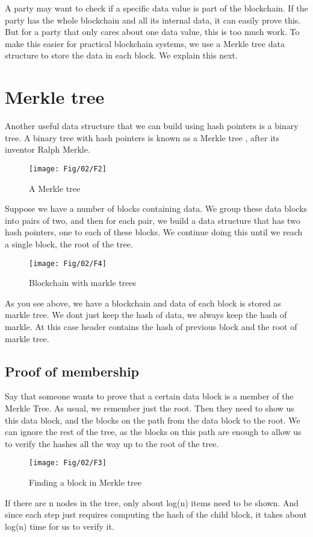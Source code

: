 A party may want to check if a specific data value is part of the blockchain. If the party has the whole blockchain and all its internal data, it can easily prove this. But for a party that only cares about one data value, this is too much work. To make this easier for practical blockchain systems, we use a Merkle tree data structure to store the data in each block. We explain this next.
\section{Merkle tree}
Another useful data structure that we can build using hash pointers is a binary tree. A binary tree with hash pointers is known as a Merkle tree , after its inventor Ralph Merkle.
\begin{figure}[h!]
	\centering
	\texttt{[image: Fig/02/F2]}
	\caption{A Merkle tree}
	\label{fig:l2_f2}
\end{figure}
Suppose we have a number of blocks containing data. We group these data blocks into pairs of two, and then for each pair, we build a data structure that has two hash pointers, one to each of these blocks. We continue doing this until we reach a single block, the root of the tree.

\begin{figure}[h!]
	\centering
	\texttt{[image: Fig/02/F4]}
	\caption{Blockchain with markle trees}
	\label{fig:l2_f4}
\end{figure}

As you see above, we have a blockchain and data of each block is stored as markle tree. We dont just keep the hash of data, we always keep the hash of markle. At this case header contains the hash of previous block and the root of markle tree.

\subsection*{Proof of membership}
Say that someone wants to prove that a certain data block is a member of the Merkle Tree. As usual, we remember just the root. Then they need to show us this data block, and the blocks on the path from the data block to the root. We can ignore the rest of the tree, as the blocks on this path are enough to allow us to verify the hashes all the way up to the root of the tree.
\begin{center}
	\begin{figure}[h!]
		\centering
		\texttt{[image: Fig/02/F3]}
		\caption{Finding a block in Merkle tree}
		\label{fig:l2_f3}
	\end{figure}
\end{center}
If there are n nodes in the tree, only about log(n) items need to be shown. And since each step just requires computing the hash of the child block, it takes about log(n) time for us to verify it.
